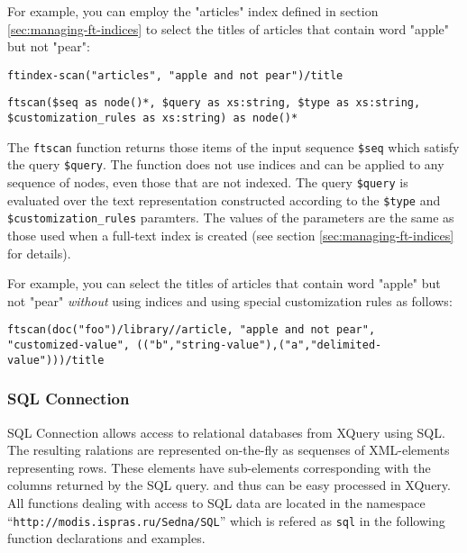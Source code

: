 \documentclass[a4paper,12pt]{article}
\begin{document}
For example, you can employ the "articles" index defined in section \ref{sec:managing-ft-indices} to select the titles of articles that contain word "apple" but not "pear":
\begin{verbatim}
ftindex-scan("articles", "apple and not pear")/title
\end{verbatim}

\begin{verbatim}
ftscan($seq as node()*, $query as xs:string, $type as xs:string,
$customization_rules as xs:string) as node()*
\end{verbatim}

The \verb!ftscan! function returns those items of the input sequence \verb!$seq! which satisfy the query \verb!$query!. The function does not use indices and can be applied to any sequence of nodes, even those that are not indexed. The query \verb!$query! is evaluated over the text representation constructed according to the \verb!$type! and \verb!$customization_rules! paramters. The values of the parameters are the same as those used when a full-text index is created (see section \ref{sec:managing-ft-indices} for details).

For example, you can select the titles of articles that contain word "apple" but not "pear" \emph{without} using indices and using special customization rules as follows:
\begin{verbatim}
ftscan(doc("foo")/library//article, "apple and not pear",
"customized-value", (("b","string-value"),("a","delimited-value")))/title
\end{verbatim}




\subsubsection{SQL Connection}
SQL Connection allows access to relational databases from XQuery using SQL.
The resulting ralations are represented on-the-fly as sequenses of XML-elements representing rows. These elements have sub-elements corresponding with the columns returned by the SQL query. and thus can be
easy processed in XQuery. All functions dealing with access to SQL data are located in the namespace
``\verb!http://modis.ispras.ru/Sedna/SQL!'' which is refered as \verb!sql!
in the following function declarations and examples.
\end{document}
